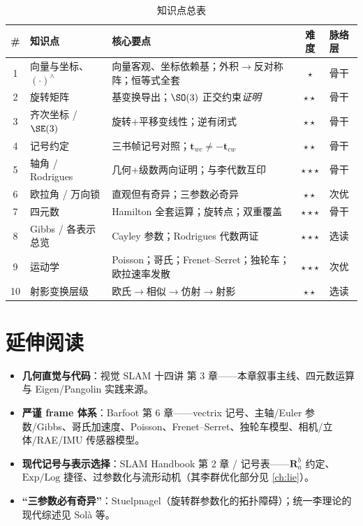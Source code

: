 \begin{table}[H]\centering\small
\caption{知识点总表}
\begin{tabular}{cllcl}
\toprule
\# & 知识点 & 核心要点 & 难度 & 脉络层 \\
\midrule
1 & 向量与坐标、$(\cdot)^\wedge$ & 向量客观、坐标依赖基；外积$\to$反对称阵；恒等式全套 & \(\star\) & 骨干\\
2 & 旋转矩阵 & 基变换导出；$\SO(3)$ 正交约束\emph{证明} & \(\star\star\) & 骨干\\
3 & 齐次坐标 / $\SE(3)$ & 旋转+平移变线性；逆有闭式 & \(\star\star\) & 骨干\\
4 & 记号约定 & 三书帧记号对照；$\mathbf{t}_{wc}\neq-\mathbf{t}_{cw}$ & \(\star\star\) & 骨干\\
5 & 轴角 / Rodrigues & 几何+级数两向证明；与李代数互印 & \(\star\star\star\) & 骨干\\
6 & 欧拉角 / 万向锁 & 直观但有奇异；三参数必奇异 & \(\star\star\) & 次优\\
7 & 四元数 & Hamilton 全套运算；旋转点；双重覆盖 & \(\star\star\star\) & 骨干\\
8 & Gibbs / 各表示总览 & Cayley 参数；Rodrigues 代数两证 & \(\star\star\star\) & 选读\\
9 & 运动学 & Poisson；哥氏；Frenet--Serret；独轮车；欧拉速率发散 & \(\star\star\star\) & 次优\\
10 & 射影变换层级 & 欧氏$\to$相似$\to$仿射$\to$射影 & \(\star\star\) & 选读\\
\bottomrule
\end{tabular}
\end{table}

\section*{延伸阅读}
\begin{itemize}
  \item \textbf{几何直觉与代码}：视觉 SLAM 十四讲\cite{gaoxiang2019slam14} 第 3 章——本章叙事主线、四元数运算与 Eigen/Pangolin 实践来源。
  \item \textbf{严谨 frame 体系}：Barfoot\cite{barfoot2024state} 第 6 章——vectrix 记号、主轴/Euler 参数/Gibbs、哥氏加速度、Poisson、Frenet--Serret、独轮车模型、相机/立体/RAE/IMU 传感器模型。
  \item \textbf{现代记号与表示选择}：SLAM Handbook\cite{carlone2026handbook} 第 2 章 / 记号表——$\mathbf{R}_a^b$ 约定、$\mathrm{Exp}/\mathrm{Log}$ 捷径、过参数化与流形动机（其李群优化部分见 \cref{ch:lie}）。
  \item \textbf{“三参数必有奇异”}：Stuelpnagel\cite{stuelpnagel1964parametrization}（旋转群参数化的拓扑障碍）；统一李理论的现代综述见 Solà 等\cite{sola2018micro}。
\end{itemize}

